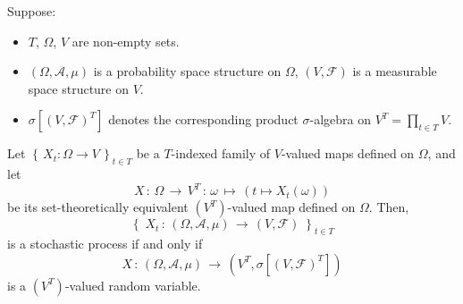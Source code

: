\begin{corollary}
\mbox{}\vskip 0.1cm
\noindent
Suppose:
\begin{itemize}
\item	$T$, $\Omega$, $V$ are non-empty sets.
\item	$\left(\Omega,\mathcal{A},\mu\right)$ is a probability space structure on $\Omega$,
		$\left(V,\mathcal{F}\right)$ is a measurable space structure on $V$.
\item	$\sigma[(V,\mathcal{F})^{T}]$ denotes the corresponding product $\sigma$-algebra
		on $V^{T} = \prod_{t\in T}V$.
\end{itemize}
Let $\left\{\,X_{t} : \Omega \longrightarrow V \,\right\}_{t \in T}$
be a $T$-indexed family of $V$-valued maps defined on $\Omega$,
and let
\begin{equation*}
X \,:\, \Omega \,\longrightarrow\, V^{T} \,:\, \omega \,\longmapsto\, \left(t \longmapsto X_{t}(\omega)\right)
\end{equation*}
be its set-theoretically equivalent $(V^{T})$-valued map defined on $\Omega$.
Then,
\begin{equation*}
\left\{\; X_{t} \,:\, \left(\Omega,\mathcal{A},\mu\right)\,\longrightarrow\,\left(V,\mathcal{F}\right) \;\right\}_{t \in T}
\end{equation*}
is a stochastic process if and only if
\begin{equation*}
X \,:\, \left(\Omega,\mathcal{A},\mu\right)\,\longrightarrow\,\left(V^{T},\sigma[(V,\mathcal{F})^{T}]\right)
\end{equation*}
is a $(V^{T})$-valued random variable.
\end{corollary}

